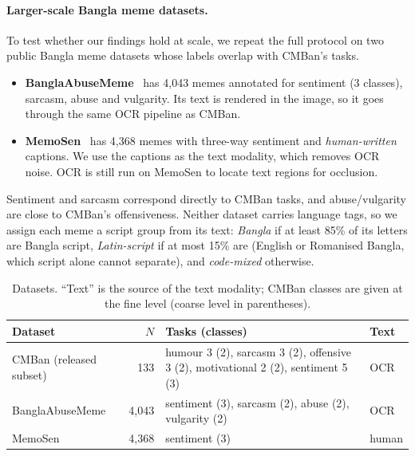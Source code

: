 \paragraph{Larger-scale Bangla meme datasets.}
To test whether our findings hold at scale, we repeat the full protocol on two public Bangla meme datasets whose
labels overlap with CMBan's tasks.
\begin{itemize}
  \item \textbf{BanglaAbuseMeme}~\cite{das2023banglaabusememe} has 4{,}043 memes annotated for sentiment
  (3 classes), sarcasm, abuse and vulgarity. Its text is rendered in the image, so it goes through the same OCR
  pipeline as CMBan.
  \item \textbf{MemoSen}~\cite{hossain2022memosen} has 4{,}368 memes with three-way sentiment and
  \emph{human-written} captions. We use the captions as the text modality, which removes OCR noise. OCR is still
  run on MemoSen to locate text regions for occlusion.
\end{itemize}
Sentiment and sarcasm correspond directly to CMBan tasks, and abuse/vulgarity are close to CMBan's offensiveness.
Neither dataset carries language tags, so we assign each meme a script group from its text: \emph{Bangla} if at
least 85\% of its letters are Bangla script, \emph{Latin-script} if at most 15\% are (English or Romanised Bangla,
which script alone cannot separate), and \emph{code-mixed} otherwise.

\begin{table}[t]
\centering
\small
\caption{Datasets. ``Text'' is the source of the text modality; CMBan classes are given at the fine level (coarse
level in parentheses).}
\label{tab:datasets}
\begin{tabular}{lrll}
\toprule
Dataset & $N$ & Tasks (classes) & Text \\
\midrule
CMBan (released subset) & 133     & humour 3 (2), sarcasm 3 (2), offensive 3 (2), motivational 2 (2), sentiment 5 (3) & OCR \\
BanglaAbuseMeme         & 4{,}043 & sentiment (3), sarcasm (2), abuse (2), vulgarity (2)                             & OCR \\
MemoSen                 & 4{,}368 & sentiment (3)                                                                    & human \\
\bottomrule
\end{tabular}
\end{table}



